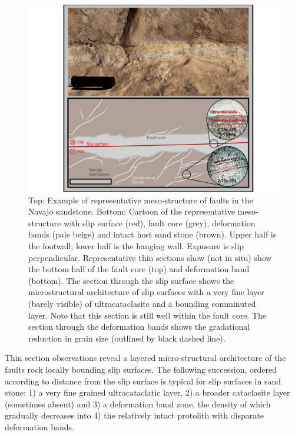 \documentclass[12pt,a4paper]{article}
\begin{document}
 \begin{figure}[h]
	\centering
		\includegraphics[width=1 \textwidth]{Fault_architecture_zoom}
	\caption{Top: Example of representative meso-structure of faults in the Navajo sandstone. Bottom: Cartoon of the representative meso-structure with slip surface (red), fault core (grey), deformation bands (pale beige) and intact host sand stone (brown). Upper half is the footwall; lower half is the hanging wall. Exposure is slip perpendicular. Representative thin sections show (not in situ) show the bottom half of the fault core (top) and deformation band (bottom). The section through the slip surface shows the microstructural architecture of slip surfaces with a very fine layer (barely visible) of ultracataclasite and a bounding comminuted layer. Note that this section is still well within the fault core. The section through the deformation bands shows the gradational reduction in grain size (outlined by black dashed line).}
	\label{fault_architecture}
\end{figure}

	Thin section observations reveal a layered micro-structural architecture of the faults rock locally bounding slip surfaces. The following succession, ordered according to distance from the slip surface is typical for slip surfaces in sand stone:  1) a very fine grained ultracataclatic layer, 2) a broader cataclasite layer (sometimes absent) and 3) a deformation band zone, the density of which gradually decreases into 4) the relatively intact protolith with disparate deformation bands.

\end{document}
